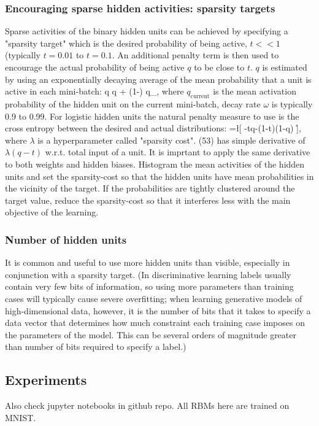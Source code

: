 \subsubsection{Encouraging sparse hidden activities: sparsity targets}
Sparse activities of the binary hidden units can be achieved by specifying a "sparsity target" which is the desired probability of being active, $t<<1$ (typically $t=0.01$ to $t=0.1$. An additional penalty term is then used to encourage the actual probability of being active $q$ to be close to $t$. $q$ is estimated by using an exponentially decaying average of the mean probability that a unit is active in each mini-batch:
\bg
q \leftarrow \omega q + (1-\omega) q_{},
\eg
where $q_{\text{current}}$ is the mean activation probability of the hidden unit on the current mini-batch, decay rate $\omega$ is typically 0.9 to 0.99. For logistic hidden units the natural penalty measure to use is the cross entropy between the desired and actual distributions:
\bg
{}=\lambda\times\l[ -t\log q-(1-t)\log(1-q) \r],
\eg
where $\lambda$ is a hyperparameter called "sparsity cost". (53) has simple derivative of $\lambda (q-t)$ w.r.t. total input of a unit. It is imprtant to apply the same derivative to both weights and hidden biases. Histogram the mean activities of the hidden units and set the sparsity-cost so that the hidden units have mean probabilities in the vicinity of the target. If the probabilities are tightly clustered around the target value, reduce the sparsity-cost so that it interferes less with the main objective of the learning.

\subsubsection{Number of hidden units}
\good It is common and useful to use more hidden units than visible, especially in conjunction with a sparsity target. (In discriminative learning labels usually contain very few bits of information, so using more parameters than training cases will typically cause severe overfitting; when learning generative models of high-dimensional data, however, it is the number of bits that it takes to specify a data vector that determines how much constraint each training case imposes on the parameters of the model. This can be several orders of magnitude greater than number of bits required to specify a label.)

\subsection{Experiments}
Also check jupyter notebooks in github repo. All RBMs here are trained on MNIST.

